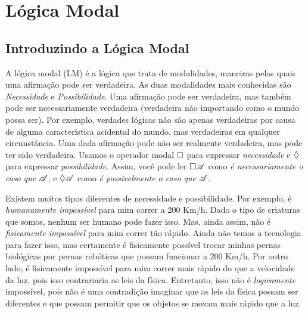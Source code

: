 
\part{Lógica Modal}
\label{ch.ML}

%

\chapter{Introduzindo a  L\'ogica Modal}
\label{Intro}

A lógica modal (LM) é a lógica que trata de modalidades, maneiras pelas quais uma afirmação pode ser verdadeira. As duas modalidades mais conhecidas são   \emph{Necessidade} e \emph{Possibilidade}.   Uma afirmação pode ser verdadeira, mas também pode ser necessariamente verdadeira (verdadeira não importando como o mundo possa ser). Por exemplo, verdades lógicas não são apenas verdadeiras por causa de alguma característica acidental do mundo, mas verdadeiras em qualquer circunstância. Uma dada afirmação pode não ser realmente verdadeira, mas pode ter sido verdadeira. 
Usamos o operador modal $\Box$ para expressar \emph{necessidade} e $\Diamond$ para expressar \emph{possibilidade}. Assim, você pode ler $\Box \mathscr{A}$ como \emph{é necessariamente o caso que} $\mathscr{A}$, e $\Diamond \mathscr{A}$ como \emph{é possivelmente o caso que}  $\mathscr{A}$.

Existem muitos tipos diferentes de necessidade e possibilidade.  Por exemplo, é    \emph{humanamente impossível} para mim correr a 200 Km/h.  Dado o tipo de criaturas que somos, nenhum ser humano pode fazer isso. Mas,  ainda assim, não é  \emph{fisicamente impossível} para mim correr tão rápido. Ainda não temos a tecnologia para fazer isso, mas certamente é fisicamente possível trocar minhas pernas biológicas por pernas robóticas que possam funcionar a 200 Km/h. Por outro lado, é fisicamente impossível para mim correr mais rápido do que a velocidade da luz, pois isso contrariaria as leis da física. Entretanto, isso não é  \emph{logicamente} impossível, pois não é uma contradição imaginar que as leis da física possam ser diferentes e que possam permitir que os objetos se movam mais rápido que a luz.

